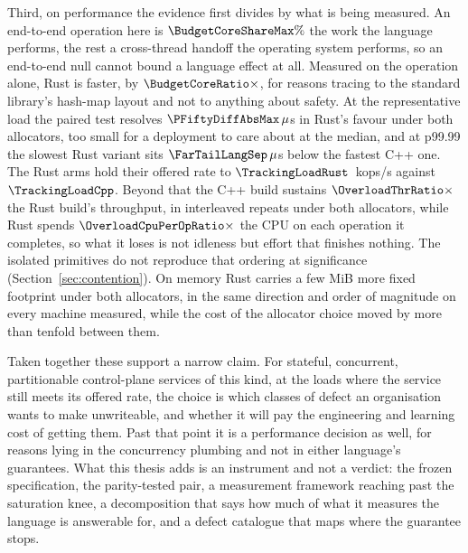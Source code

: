 Third, on performance the evidence first divides by what is being measured. An end-to-end
operation here is $\BudgetCoreShareMax\%$ the work the language performs, the rest a cross-thread
handoff the operating system performs, so an end-to-end null cannot bound a language effect at
all. Measured on the operation alone, Rust is faster, by $\BudgetCoreRatio\times$, for reasons
tracing to the standard library's hash-map layout and not to anything about safety. At the
representative load the paired test resolves $\PFiftyDiffAbsMax\,\mu$s in Rust's favour under both
allocators, too small for a deployment to care about at the median, and at p99.99 the slowest Rust
variant sits $\FarTailLangSep\,\mu$s below the fastest C++ one. The Rust arms hold their offered
rate to $\TrackingLoadRust$~kops/s against $\TrackingLoadCpp$. Beyond that the C++ build sustains
$\OverloadThrRatio\times$ the Rust build's throughput, in \OverloadThrAgree{} interleaved repeats
under both allocators, while Rust spends $\OverloadCpuPerOpRatio\times$ the CPU on each operation
it completes, so what it loses is not idleness but effort that finishes nothing. The isolated
primitives do not reproduce that ordering at significance (Section~\ref{sec:contention}). On
memory Rust carries a few MiB more fixed footprint under both allocators, in the same direction
and order of magnitude on every machine measured, while the cost of the allocator choice moved by
more than tenfold between them.

Taken together these support a narrow claim. For stateful, concurrent, partitionable
control-plane services of this kind, at the loads where the service still meets its offered rate,
the choice is which classes of defect an organisation wants to make unwriteable, and whether it
will pay the engineering and learning cost of getting them. Past that point it is a performance
decision as well, for reasons lying in the concurrency plumbing and not in either language's
guarantees. What this thesis adds is an instrument and not a verdict: the frozen specification,
the parity-tested pair, a measurement framework reaching past the saturation knee, a decomposition
that says how much of what it measures the language is answerable for, and a defect catalogue that
maps where the guarantee stops.


